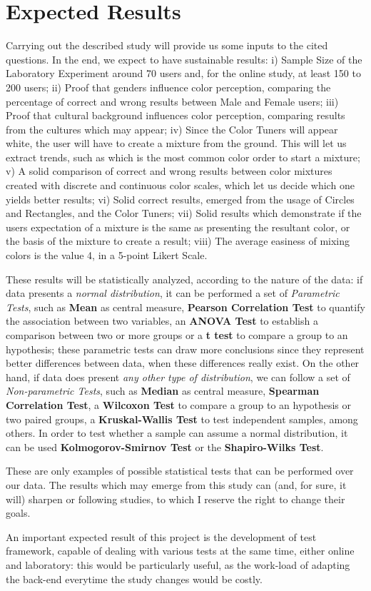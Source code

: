\documentclass{report}
\begin{document}
\section{Expected Results}
Carrying out the described study will provide us some inputs to the cited questions. In the end, we expect to have sustainable results:
i) Sample Size of the Laboratory Experiment around 70 users and, for the online study, at least 150 to 200 users;
ii) Proof that genders influence color perception, comparing the percentage of correct and wrong results between Male and Female users;
iii) Proof that cultural background influences color perception, comparing results from the cultures which may appear;
iv) Since the Color Tuners will appear white, the user will have to create a mixture from the ground. This will let us extract trends, such as which
is the most common color order to start a mixture;
v) A solid comparison of correct and wrong results between color mixtures created with discrete and continuous color scales, which let us decide
which one yields better results;
vi) Solid correct results, emerged from the usage of Circles and Rectangles, and the Color Tuners;
vii) Solid results which demonstrate if the users expectation of a mixture is the same as presenting the resultant color, or the basis of the mixture
to create a result; viii) The average easiness of mixing colors is the value 4, in a 5-point Likert Scale. \par
These results will be statistically analyzed, according to the nature of the data: if data presents a \emph{normal distribution}, it can be
performed a set of \emph{Parametric Tests}, such as \textbf{Mean} as central measure, \textbf{Pearson Correlation Test} to quantify the
association between two variables, an \textbf{ANOVA Test} to establish a comparison between two or more groups or a \textbf{t test} to compare
a group to an hypothesis; these parametric tests can draw more conclusions since they represent better differences between data, when these
differences really exist. On the other hand, if data does present \emph{any other type of distribution}, we can follow a set of
\emph{Non-parametric Tests}, such as \textbf{Median} as central measure, \textbf{Spearman Correlation Test}, a \textbf{Wilcoxon Test} to compare
a group to an hypothesis or two paired groups, a \textbf{Kruskal-Wallis Test} to test independent samples, among others. In order to test whether
a sample can assume a normal distribution, it can be used \textbf{Kolmogorov-Smirnov Test} or the \textbf{Shapiro-Wilks Test}. \par
These are only examples of possible statistical tests that can be performed over our data. The results which may emerge from this study can
(and, for sure, it will) sharpen or following studies, to which I reserve the right to change their goals. \par
An important expected result of this project is the development of test framework, capable of dealing with various tests at the same time, either online
and laboratory: this would be particularly useful, as the work-load of adapting the back-end everytime the study changes would be costly.
%
\end{document}
